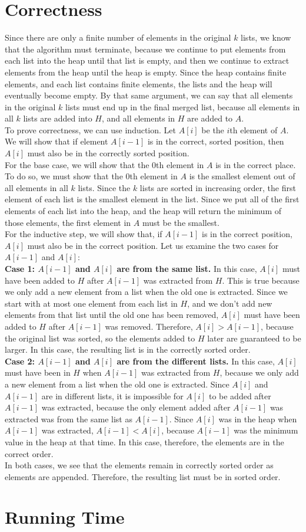 \documentclass[12pt]{article}
\begin{document}
\section*{Correctness}
Since there are only a finite number of elements in the original $k$ lists, we know that the algorithm must terminate, because we continue to put elements from each list into the heap until that list is empty, and then we continue to extract elements from the heap until the heap is empty. Since the heap contains finite elements, and each list contains finite elements, the lists and the heap will eventually become empty. By that same argument, we can say that all elements in the original $k$ lists must end up in the final merged list, because all elements in all $k$ lists are added into $H$, and all elements in $H$ are added to $A$.\\
To prove correctness, we can use induction. Let $A[i]$ be the $i$th element of $A$. We will show that if element $A[i-1]$ is in the correct, sorted position, then $A[i]$ must also be in the correctly sorted position.\\
For the base case, we will show that the $0$th element in $A$ is in the correct place. To do so, we must show that the $0$th element in $A$ is the smallest element out of all elements in all $k$ lists. Since the $k$ lists are sorted in increasing order, the first element of each list is the smallest element in the list. Since we put all of the first elements of each list into the heap, and the heap will return the minimum of those elements, the first element in $A$ must be the smallest.\\
For the inductive step, we will show that, if $A[i-1]$ is in the correct position, $A[i]$ must also be in the correct position. Let us examine the two cases for $A[i-1]$ and $A[i]$:\\
\textbf{Case 1: $A[i-1]$ and $A[i]$ are from the same list.} In this case, $A[i]$ must have been added to $H$ after $A[i-1]$ was extracted from $H$. This is true because we only add a new element from a list when the old one is extracted. Since we start with at most one element from each list in $H$, and we don't add new elements from that list until the old one has been removed, $A[i]$ must have been added to $H$ after $A[i-1]$ was removed. Therefore, $A[i] > A[i-1]$, because the original list was sorted, so the elements added to $H$ later are guaranteed to be larger. In this case, the resulting list is in the correctly sorted order.\\
\textbf{Case 2: $A[i-1]$ and $A[i]$ are from the different lists.} In this case, $A[i]$ must have been in $H$ when $A[i-1]$ was extracted from $H$, because we only add a new element from a list when the old one is extracted. Since $A[i]$ and $A[i-1]$ are in different lists, it is impossible for $A[i]$ to be added after $A[i-1]$ was extracted, because the only element added after $A[i-1]$ was extracted was from the same list as $A[i-1]$. Since $A[i]$ was in the heap when $A[i-1]$ was extracted, $A[i-1] < A[i]$, because $A[i-1]$ was the minimum value in the heap at that time. In this case, therefore, the elements are in the correct order.\\
In both cases, we see that the elements remain in correctly sorted order as elements are appended. Therefore, the resulting list must be in sorted order.

\section*{Running Time}
\end{document}
